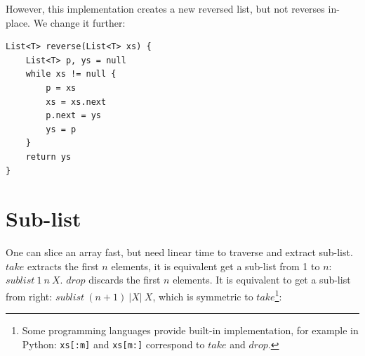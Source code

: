 \documentclass[b5paper]{article}
\begin{document}
However, this implementation creates a new reversed list, but not reverses in-place. We change it further:

\begin{lstlisting}[language=Bourbaki]
List<T> reverse(List<T> xs) {
    List<T> p, ys = null
    while xs != null {
        p = xs
        xs = xs.next
        p.next = ys
        ys = p
    }
    return ys
}
\end{lstlisting}

\begin{Exercise}\label{ex:list-transform}
\end{Exercise}

\begin{Answer}[ref = {ex:list-transform}]
\end{Answer}

\section{Sub-list}
   
One can slice an array fast, but need linear time to traverse and extract sub-list. $take$ extracts the first $n$ elements, it is equivalent get a sub-list from 1 to $n$: $sublist\ 1\ n\ X$. $drop$ discards the first $n$ elements. It is equivalent to get a sub-list from right: $sublist\ (n+1)\ |X|\ X$, which is symmetric to $take$\footnote{Some programming languages provide built-in implementation, for example in Python: \texttt{xs[:m]} and \texttt{xs[m:]} correspond to $take$ and $drop$.}:

\be
{}
\ee
\end{document}

